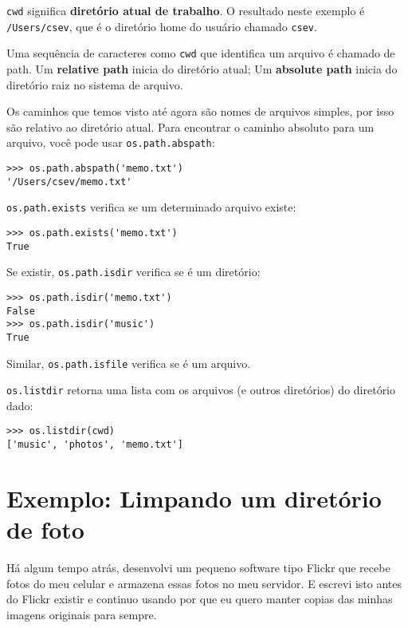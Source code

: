 \documentclass{book}
\begin{document}
%
{\tt cwd} significa  {\bf diretório atual de trabalho}. O resultado neste exemplo é 
{\tt /Users/csev}, que é o diretório home do usuário chamado {\tt csev}.


Uma sequência de caracteres como {\tt cwd} que identifica um arquivo é chamado de path.
Um {\bf relative path} inicia do diretório atual;
Um {\bf absolute path} inicia do diretório raiz no sistema de arquivo.




Os caminhos que temos visto até agora são nomes de arquivos simples, por isso são relativo ao diretório atual. Para encontrar o caminho absoluto para um arquivo, você pode usar {\tt os.path.abspath}:

\begin{verbatim}
>>> os.path.abspath('memo.txt')
'/Users/csev/memo.txt'
\end{verbatim}

%
{\tt os.path.exists} verifica se um determinado arquivo existe:


\begin{verbatim}
>>> os.path.exists('memo.txt')
True
\end{verbatim}
%
Se existir, {\tt os.path.isdir} verifica se é um diretório:

\begin{verbatim}
>>> os.path.isdir('memo.txt')
False
>>> os.path.isdir('music')
True
\end{verbatim}

%
Similar, {\tt os.path.isfile} verifica se é um arquivo.

{\tt os.listdir} retorna uma lista com os arquivos (e outros diretórios) do diretório dado:

\begin{verbatim}
>>> os.listdir(cwd)
['music', 'photos', 'memo.txt']
\end{verbatim}
%

\section{Exemplo: Limpando um diretório de foto}

Há algum tempo atrás, desenvolvi um pequeno software tipo Flickr que recebe fotos do meu celular e armazena essas fotos no meu servidor. E escrevi isto antes do Flickr existir e continuo usando por que eu quero manter copias das minhas imagens originais para sempre. 
\end{document}
